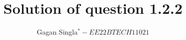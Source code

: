 \documentclass[journal,12pt,twocolumn]{IEEEtran}
\theoremstyle{remark}
\begin{document}
%




\vspace{3cm}

\title{
Solution of question 1.2.2
}
\author{ Gagan Singla$^{*} - EE22BTECH11021$%

	
}	


%
%
%

% 
%



% 
\end{document}
